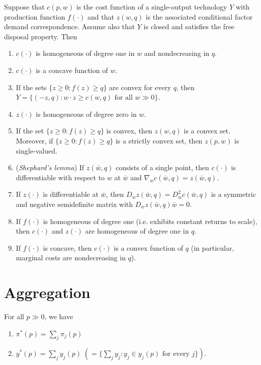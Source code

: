 \begin{prop}
    Suppose that $c(p, w)$ is the cost function of a single-output technology $Y$ with production function $f(\cdot)$ and that $z(w, q)$ is the associated conditional factor demand correspondence. Assume also that $Y$ is closed and satisfies the free disposal property. Then
    \begin{enumerate}
        \item $c(\cdot)$ is homogeneous of degree one in $w$ and nondecreasing in $q$.
        \item $c(\cdot)$ is a concave function of $w$.
        \item If the sets $\{z \geq 0: f(z) \geq q\}$ are convex for every $q$, then $Y = \{(-z, q): w \cdot z \geq c(w, q) \text{ for all } w \gg 0\}$.
        \item $z(\cdot)$ is homogeneous of degree zero in $w$.
        \item If the set $\{z \geq 0: f(z) \geq q\}$ is convex, then $z(w, q)$ is a convex set. Moreover, if $\{z \geq 0: f(z) \geq q\}$ is a strictly convex set, then $z(p, w)$ is single-valued.
        \item (\emph{Shephard's lemma}) If $z(\bar{w}, q)$ consists of a single point, then $c(\cdot)$ is differentiable with respect to $w$ at $\bar{w}$ and $\nabla_w c(\bar{w}, q) = z(\bar{w}, q)$.
        \item If $z(\cdot)$ is differentiable at $\bar{w}$, then $D_w z(\bar{w}, q) = D^2_w c(\bar{w}, q)$ is a symmetric and negative semidefinite matrix with $D_w z(\bar{w}, q) \bar{w} = 0$.
        \item If $f(\cdot)$ is homogeneous of degree one (i.e. exhibits constant returns to scale), then $c(\cdot)$ and $z(\cdot)$ are homogeneous of degree one in $q$.
        \item If $f(\cdot)$ is concave, then $c(\cdot)$ is a convex function of $q$ (in particular, marginal costs are nondecreasing in $q$).
    \end{enumerate}
\end{prop}


\addtocounter{section}{1}


\section{Aggregation}

\begin{prop}
    For all $p \gg 0$, we have
    \begin{enumerate}
        \item $\pi^* (p) = \sum_j \pi_j (p)$
        \item $y^* (p) = \sum_j y_j (p) \; (= \{\sum_j y_j : y_j \in y_j(p) \text{ for every } j\})$.
    \end{enumerate}
\end{prop}


